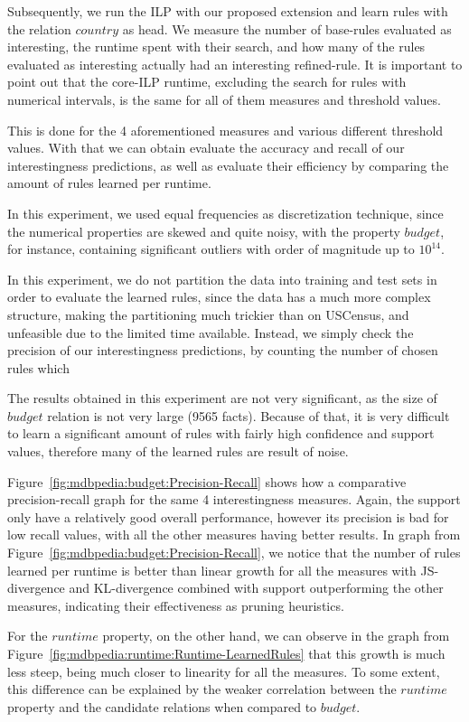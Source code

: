 Subsequently, we run the ILP with our proposed extension and learn rules with the relation $country$ as head. We
measure the number of base-rules evaluated as interesting, the runtime spent with their search, and how many of the
rules evaluated as interesting actually had an interesting refined-rule. It is important to point out that the
core-ILP runtime, excluding the search for rules with numerical intervals, is the same for all of them measures and
threshold values. 

This is done for the 4 aforementioned measures and various different threshold values. With that we can obtain evaluate
the accuracy and recall of our interestingness predictions, as well as evaluate their efficiency by comparing the amount
of rules learned per runtime.

In this experiment, we used equal frequencies as discretization technique, since the numerical properties are skewed and
quite noisy, with the property $budget$, for instance, containing significant outliers with order of magnitude up to
$10^{14}$.

In this experiment, we do not partition the data into training and test sets in order to evaluate the learned rules,
since the data has a much more complex structure, making the partitioning much trickier than on USCensus, and unfeasible
due to the limited time available. Instead, we simply check the precision of our interestingness predictions, by
counting the number of chosen rules which 

The results obtained in this experiment are not very significant, as the size of $budget$ relation is
not very large (9565 facts). Because of that, it is very difficult to learn a significant amount of rules with fairly
high confidence and support values, therefore many of the learned rules are result of noise.

Figure~\ref{fig:mdbpedia:budget:Precision-Recall} shows how a comparative precision-recall graph for the same 4
interestingness measures. Again, the support only have a relatively good overall performance, however its precision is
bad for low recall values, with all the other measures having better results. In graph from
Figure~\ref{fig:mdbpedia:budget:Precision-Recall}, we notice that the number of rules learned per runtime is better
than linear growth for all the measures with JS-divergence and KL-divergence combined with support outperforming the
other measures, indicating their effectiveness as pruning heuristics.

For the $runtime$ property, on the other hand, we can observe in the graph from
Figure~\ref{fig:mdbpedia:runtime:Runtime-LearnedRules} that this growth is much less steep, being much closer to
linearity for all the measures. To some extent, this difference can be explained by the weaker correlation between the
$runtime$ property and the candidate relations when compared to $budget$. 


